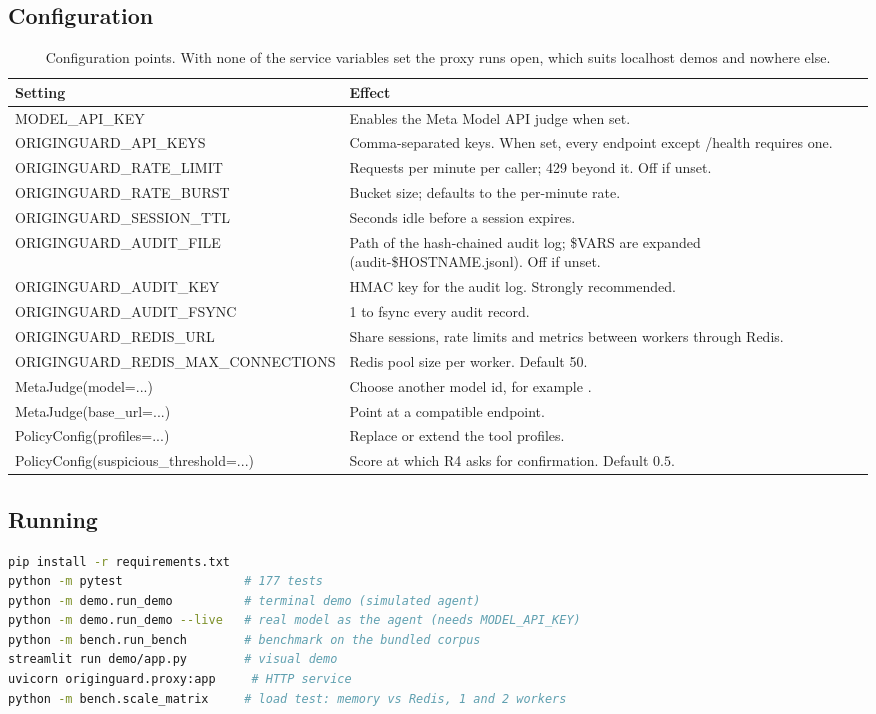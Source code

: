 \documentclass[11pt,a4paper]{article}
\newcommand{\code}[1]{\texttt{\detokenize{#1}}}
\begin{document}
\subsection{Configuration}\label{tab:config}
\begin{table}[H]
\centering
\begin{tabularx}{\linewidth}{@{}>{\ttfamily\footnotesize}p{7.7cm}Y@{}}
\toprule
Setting & Effect \\
\midrule
MODEL\_API\_KEY & Enables the Meta Model API judge when set. \\
ORIGINGUARD\_API\_KEYS & Comma-separated keys. When set, every endpoint except /health requires one. \\
ORIGINGUARD\_RATE\_LIMIT & Requests per minute per caller; 429 beyond it. Off if unset. \\
ORIGINGUARD\_RATE\_BURST & Bucket size; defaults to the per-minute rate. \\
ORIGINGUARD\_SESSION\_TTL & Seconds idle before a session expires. \\
ORIGINGUARD\_AUDIT\_FILE & Path of the hash-chained audit log; \$VARS are expanded (audit-\$HOSTNAME.jsonl). Off if unset. \\
ORIGINGUARD\_AUDIT\_KEY & HMAC key for the audit log. Strongly recommended. \\
ORIGINGUARD\_AUDIT\_FSYNC & 1 to fsync every audit record. \\
ORIGINGUARD\_REDIS\_URL & Share sessions, rate limits and metrics between workers through Redis. \\
ORIGINGUARD\_REDIS\_MAX\_CONNECTIONS & Redis pool size per worker. Default 50. \\
MetaJudge(model=...) & Choose another model id, for example \code{muse-spark-1.2}. \\
MetaJudge(base\_url=...) & Point at a compatible endpoint. \\
PolicyConfig(profiles=...) & Replace or extend the tool profiles. \\
PolicyConfig(suspicious\_threshold=...) & Score at which R4 asks for confirmation. Default $0.5$. \\
\bottomrule
\end{tabularx}
\caption{Configuration points. With none of the service variables set the proxy runs open, which suits localhost demos and nowhere else.}
\end{table}

\subsection{Running}
\begin{lstlisting}[language=bash]
pip install -r requirements.txt
python -m pytest                 # 177 tests
python -m demo.run_demo          # terminal demo (simulated agent)
python -m demo.run_demo --live   # real model as the agent (needs MODEL_API_KEY)
python -m bench.run_bench        # benchmark on the bundled corpus
streamlit run demo/app.py        # visual demo
uvicorn originguard.proxy:app     # HTTP service
python -m bench.scale_matrix     # load test: memory vs Redis, 1 and 2 workers
\end{lstlisting}
\end{document}
